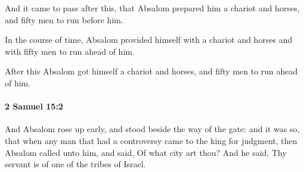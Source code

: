 			\begin{versebox}
					\item[BHS] 
					\item[ASV] And it came to pass after this, that Absalom prepared him a chariot and horses, and fifty men to run before him.
					\item[NIV] In the course of time, Absalom provided himself with a chariot and horses and with fifty men to run ahead of him.
					\item[NRSV] After this Absalom got himself a chariot and horses, and fifty men to run ahead of him.
			\end{versebox}

		\paragraph{2 Samuel 15:2} %
			\label{2SAMUEL-15-2}

			And Absalom rose up early, and stood beside the way of the gate: and it was so, that when any man that had a controversy came to the king for judgment, then Absalom called unto him, and said, Of what city art thou? And he said, Thy servant is of one of the tribes of Israel.

